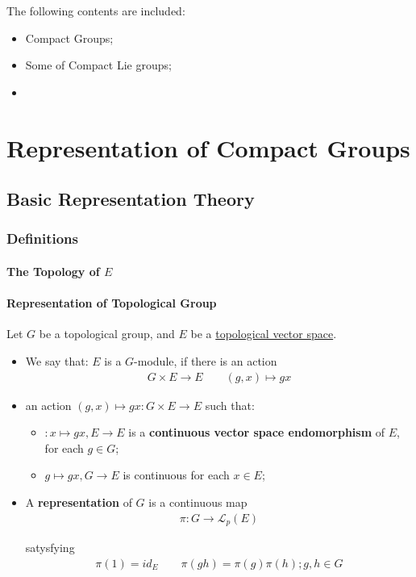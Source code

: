 \documentclass[Total.tex]{subfiles}
\begin{document}
	The following contents are included:
	\begin{itemize}
		\item Compact Groups;
		\item Some of Compact Lie groups;
		\item 
	\end{itemize}
	\chapter{Representation of Compact Groups}
		\section{Basic Representation Theory}
			\subsection{Definitions}
			\subsubsection{The Topology of $E$}
			\subsubsection{Representation of Topological Group}
			\begin{Def}
				Let $G$ be a topological group, and $E$ be a \underline{topological vector space}.
				\begin{itemize}
					\item We say that: $E$ is a $G$-module, if there is an action
					\begin{gather*}
						G\times E\rightarrow E\qquad (g,x)\mapsto gx
					\end{gather*}
					\item 
					an action $(g,x)\mapsto gx:G\times E\rightarrow E$ such that:
					\begin{itemize}
						\item $:x\mapsto gx,E\rightarrow E$ is a \textbf{continuous vector space endomorphism} of $E$, for each $g\in G$;
						\item $g\mapsto gx,G\rightarrow E$ is continuous for each $x\in E$;
					\end{itemize}
					\item A \textbf{representation} of $G$ is a continuous map
					\begin{gather*}
						\pi:G\rightarrow \mathcal{L}_p(E)
					\end{gather*}
					
					satysfying
					\begin{gather*}
						\pi(1)=id_E\qquad \pi(gh)=\pi(g)\pi(h);g,h\in G
					\end{gather*}
				\end{itemize}
			\end{Def}
			
\end{document}
